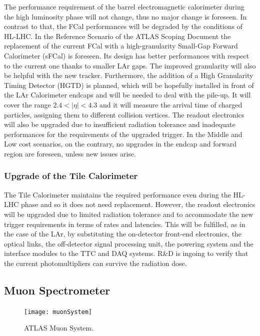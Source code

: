 \documentclass[a4paper,twoside,12pt]{article}
\begin{document}
The performance requirement of the barrel electromagnetic calorimeter during the high luminosity phase will not change, thus no major change is foreseen. In contrast to that, the FCal performances will be degraded by the conditions of HL-LHC. In the Reference Scenario of the ATLAS Scoping Document\cite{scoping} the replacement of the current FCal with a high-granularity Small-Gap Forward Calorimeter (sFCal) is foreseen. Its design has better performances with respect to the current one thanks to smaller LAr gaps. The improved granularity will also be helpful with the new 
tracker. Furthermore, the addition of a High Granularity Timing Detector (HGTD) is planned, which will be hopefully installed in front of the LAr Calorimeter endcaps and will be needed to deal with the
pile-up. It will cover the range $2.4 < |\eta| < 4.3$ and it will measure the arrival time of charged particles, assigning them to different collision vertices. The readout electronics will also be upgraded due to insufficient radiation tolerance and inadequate performances for the requirements of the upgraded trigger. In the Middle and Low cost 
scenarios, on the contrary, no upgrades in the endcap and forward region are foreseen, unless new issues arise. \\

\subsubsection*{Upgrade of the Tile Calorimeter}

The Tile Calorimeter maintains the required performance even during the HL-LHC phase and
so it does not need replacement. However, the readout electronics will be upgraded due to limited radiation tolerance and to accommodate the new trigger requirements in terms of rates and latencies. This will be fulfilled, as in the case of the LAr, by substituting the on-detector front-end electronics, the optical links, the off-detector signal processing unit, the powering system and the interface modules to the TTC and DAQ systems. R\&D is ingoing to verify that the current photomultipliers can survive the radiation dose.

\subsection{Muon Spectrometer}\label{sec:muon}\cite{muon_tdr}\cite{Aad:2008zzm}

\begin{figure} [h]
	\centering
	\texttt{[image: muonSystem]}
	\caption{ATLAS Muon System\cite{muon_tdr}.}
	\label{fig:muonSystem}
\end{figure}
\end{document}
